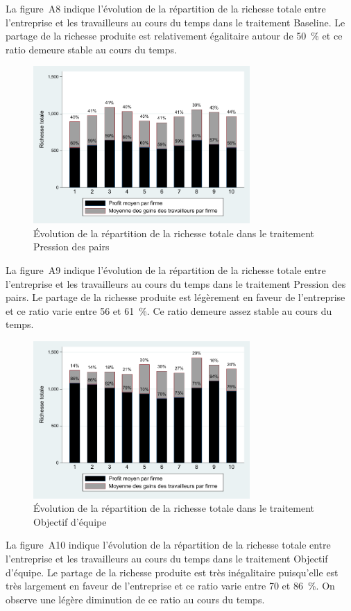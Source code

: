 \begin{Article}
\begin{refsection}[Lebourges]
\begin{appendices}
\vspace{0.2cm}
La figure~A8 indique l'évolution de la répartition de la richesse
totale entre l'entreprise et les travailleurs au cours du temps dans le
traitement Baseline. Le partage de la richesse produite est relativement
égalitaire autour de 50~\% et ce ratio demeure stable au cours du temps.

\begin{figure}[h]
    \centering
    \caption{Évolution de la répartition de la richesse totale dans le traitement Pression des pairs}
    \includegraphics[height=6cm]{05_graphA9.pdf}
\end{figure}

La figure~A9 indique l'évolution de la répartition de la richesse
totale entre l'entreprise et les travailleurs au cours du temps dans le
traitement Pression des pairs. Le partage de la richesse produite est
légèrement en faveur de l'entreprise et ce ratio varie entre 56 et
61~\%. Ce ratio demeure assez stable au cours du temps.

\begin{figure}[h]
    \centering
    \caption{Évolution de la répartition de la richesse totale dans le traitement Objectif d'équipe}
    \includegraphics[height=6cm]{05_graphA10.pdf}
\end{figure}

La figure~A10 indique l'évolution de la répartition de la richesse
totale entre l'entreprise et les travailleurs au cours du temps dans le
traitement Objectif d'équipe. Le partage de la richesse produite est
très inégalitaire puisqu'elle est très largement en faveur de
l'entreprise et ce ratio varie entre 70 et 86~\%. On observe une légère
diminution de ce ratio au cours du temps.


\end{appendices}
\end{refsection}
\end{Article}
